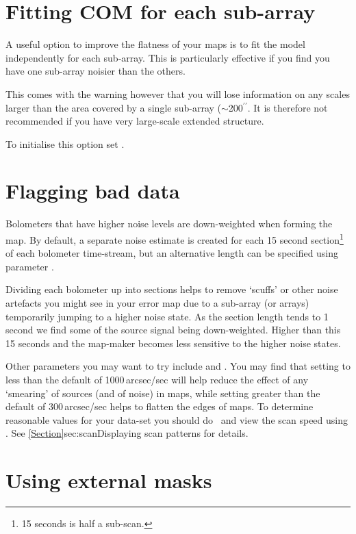 \section{Fitting COM for each sub-array}
\label{sec:fitcom}

A useful option to improve the flatness of your maps is to fit the
 model independently for each sub-array. This is
particularly effective if you find you have one sub-array noisier than
the others.

This comes with the warning however that you will lose information on
any scales larger than the area covered by a single sub-array 
($\sim$200$^{\prime\prime}$. It is therefore not recommended if 
you have very large-scale extended structure.

To initialise this option set .


\section{Flagging bad data}
\label{sec:noibox}

Bolometers that have higher noise levels are down-weighted when forming
the map. By default, a separate noise estimate is created for each
15 second section\footnote{15 seconds is half a sub-scan.} of each bolometer
time-stream, but an alternative length can be specified using parameter
.

Dividing each bolometer up into sections helps to remove `scuffs' or other
noise artefacts you might see in your error map due to a sub-array (or
arrays) temporarily jumping to a higher noise state. As the section length
tends to 1 second we find some of the source signal being down-weighted.
Higher than this 15 seconds and the map-maker becomes less sensitive to
the higher noise states.

Other parameters you may want to try include  and
. You may find that setting  to less
than the default of 1000\,arcsec/sec will help reduce the effect of any
`smearing' of sources (and of noise) in maps, while setting
 greater than the default of 300\,arcsec/sec helps to
flatten the edges of maps. To determine reasonable values for your
 data-set you should do \jcmtstate\ and view the scan speed using
\topcat. See \cref{Section}{sec:scan}{Displaying scan patterns} for
details.


\section{Using external masks}
\label{sec:maskbe}

